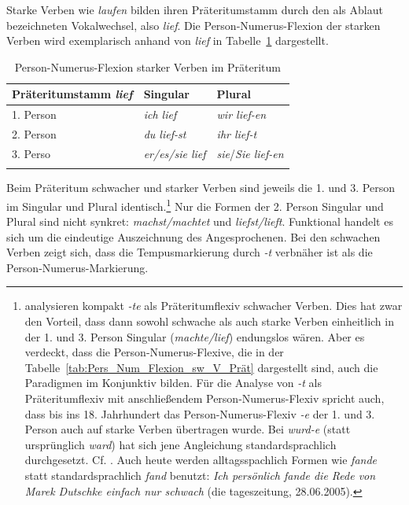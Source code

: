 Starke Verben wie \textit{laufen} bilden ihren Präteritumstamm durch den als Ablaut bezeichneten Vokalwechsel, also \textit{lief}. Die Person-Numerus-Flexion der starken Verben wird exemplarisch anhand von \textit{lief} in Tabelle~\ref{tab:Pers_Num_Flexion_st_V_Prät} dargestellt. 

\begin{table}
  \centering
  \begin{tabular}{l l l}
    \lsptoprule
    Präteritumstamm \textit{lief} & Singular & Plural \\
    \hline
    1. Person & \textit{ich lief}  & \textit{wir lief-en} \\
    2. Person & \textit{du lief-st}  & \textit{ihr lief-t} \\
    3. Perso & \textit{er/es/sie lief} & \textit{sie}/\textit{Sie lief-en} \\
    \lspbottomrule 
  \end{tabular}
  \caption{Person-Numerus-Flexion starker Verben im Präteritum}
  \label{tab:Pers_Num_Flexion_st_V_Prät}
\end{table}

Beim Präteritum schwacher und starker Verben sind jeweils die 1. und 3. Person im Singular und Plural identisch.\footnote{\citet[13]{ThieroffVogel2012} analysieren kompakt \textit{-te} als Präteritumflexiv schwacher Verben. Dies hat zwar den Vorteil, dass dann sowohl schwache als auch starke Verben einheitlich in der 1. und 3. Person Singular (\textit{machte/lief}) endungslos wären. Aber es verdeckt, dass die Person-Numerus-Flexive, die in der Tabelle~\ref{tab:Pers_Num_Flexion_sw_V_Prät} dargestellt sind, auch die Paradigmen im Konjunktiv bilden. Für die Analyse von \textit{-t} als Präteritumflexiv mit anschließendem Person-Numerus-Flexiv spricht auch, dass bis ins 18. Jahrhundert das Person-Numerus-Flexiv \textit{-e} der 1. und 3. Person auch auf starke Verben übertragen wurde. Bei \textit{wurd-e} (statt ursprünglich \textit{ward}) hat sich jene Angleichung standardsprachlich durchgesetzt. Cf. \citet[198]{Paul1986_1917_Fx}. Auch heute werden alltagsspachlich Formen wie \textit{fande} statt standardsprachlich \textit{fand} benutzt: \textit{Ich persönlich fande die Rede von Marek Dutschke einfach nur schwach} (die tageszeitung, 28.06.2005).} Nur die Formen der 2. Person Singular und Plural sind nicht synkret: \textit{machst/machtet} und \textit{liefst/lieft}. Funktional handelt es sich um die eindeutige Auszeichnung des Angesprochenen. Bei den schwachen Verben zeigt sich, dass die Tempusmarkierung durch \textit{-t} verbnäher ist als die Person-Numerus-Markierung.


